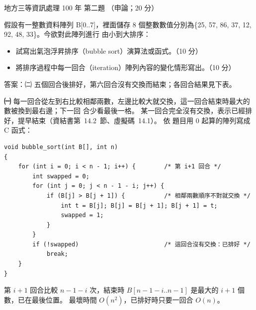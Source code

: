 \begin{pastexam}[label={px:df3-100-ds-02}]{地方三等資訊處理 100 年 第二題}
（申論；20 分）

假設有一整數資料陣列 B[0..7]，裡面儲存 8 個整數數值分別為\{25, 57, 86, 37, 12, 92, 48, 33\}。今欲對此陣列進行
由小到大排序：
\begin{itemize}[leftmargin=2.2em, nosep]
\item[㈠] 試寫出氣泡浮昇排序（bubble sort）演算法或函式。（10 分）
\item[㈡] 將排序過程中每一回合（iteration）陣列內容的變化情形寫出。（10 分）
\end{itemize}
\end{pastexam}

\begin{pastsoln}
答案：㈡ 五個回合後排好，第六回合沒有交換而結束；各回合結果見下表。

\textbf{㈠} 每一回合從左到右比較相鄰兩數，左邊比較大就交換，這一回合結束時最大的數被換到最右邊；下一回
合少看最後一格。 某一回合完全沒有交換，表示已經排好，提早結束（資結書第~14.2~節、虛擬碼~14.1）。 依
題目用 $0$ 起算的陣列寫成 C 函式：
\begin{verbatim}
void bubble_sort(int B[], int n)
{
    for (int i = 0; i < n - 1; i++) {        /* 第 i+1 回合 */
        int swapped = 0;
        for (int j = 0; j < n - 1 - i; j++) {
            if (B[j] > B[j + 1]) {           /* 相鄰兩數順序不對就交換 */
                int t = B[j]; B[j] = B[j + 1]; B[j + 1] = t;
                swapped = 1;
            }
        }
        if (!swapped)                        /* 這回合沒有交換：已排好 */
            break;
    }
}
\end{verbatim}
第 $i + 1$ 回合比較 $n - 1 - i$ 次，結束時 $B[n-1-i..n-1]$ 是最大的 $i + 1$ 個數，已在最後位置。 最壞時間
$O(n^2)$，已排好時只要一回合 $O(n)$。


\end{pastsoln}
